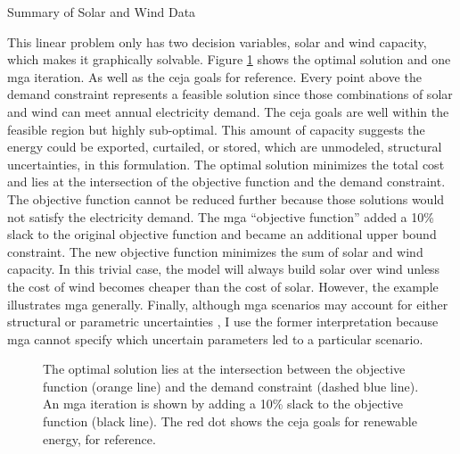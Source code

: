 \begin{table}[H]
  \centering
  \caption{Summary of Solar and Wind Data}
  \label{tab:naive}
  \resizebox{0.75\textwidth}{!}{
  
  }
\end{table}

This linear problem only has two decision variables, solar and wind capacity,
which makes it graphically solvable. Figure \ref{fig:mga-fig} shows the optimal
solution and one \gls{mga} iteration. As well as the \gls{ceja} goals for reference.
Every point above the demand constraint represents a feasible solution since those
combinations of solar and wind can meet annual electricity demand. The \gls{ceja} goals
are well within the feasible region but highly sub-optimal.
This amount of capacity suggests the energy could be exported, curtailed, or stored,
which are unmodeled, structural uncertainties, in this formulation.
The optimal solution minimizes the total cost and lies at the intersection
of the objective function and the demand constraint. The objective function cannot
be reduced further because those solutions would not satisfy the electricity demand.
The \gls{mga} ``objective function'' added a 10\% slack to the original objective
function and became an additional upper bound constraint. The new objective function
minimizes the sum of solar and wind capacity. In this trivial case, the model will
always build solar over wind unless the cost of wind becomes cheaper than the cost of
solar. However, the example illustrates \gls{mga} generally. Finally, although \gls{mga}
scenarios may account for either structural or parametric uncertainties
\cite{decarolis_modelling_2016}, I use the former interpretation because
\gls{mga} cannot specify which uncertain parameters led to a particular scenario.
\begin{figure}[H]
  \centering
  \resizebox{0.8\columnwidth}{!}{}
  \caption{The optimal solution lies at the intersection between the objective
  function (orange line) and the demand constraint (dashed blue line). An \gls{mga}
  iteration is shown by adding a 10\% slack to the objective function (black line).
  The red dot shows the \gls{ceja} goals for renewable energy, for reference.}
  \label{fig:mga-fig}
\end{figure}

